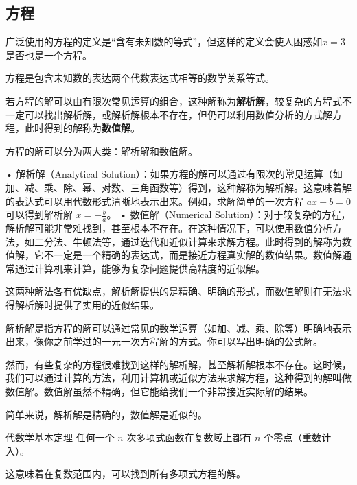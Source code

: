 
\begin{issues}
\issueDraft
\end{issues}

\subsection{方程}

广泛使用的方程的定义是“含有未知数的等式”，但这样的定义会使人困惑如$x=3$是否也是一个方程。

方程是包含未知数的表达两个代数表达式相等的数学关系等式。

若方程的解可以由有限次常见运算的组合，这种解称为\textbf{解析解}，较复杂的方程式不一定可以找出解析解，或解析解根本不存在，但仍可以利用数值分析的方式解方程，此时得到的解称为\textbf{数值解}。

方程的解可以分为两大类：解析解和数值解。

	•	解析解（Analytical Solution）：如果方程的解可以通过有限次的常见运算（如加、减、乘、除、幂、对数、三角函数等）得到，这种解称为解析解。这意味着解的表达式可以用代数形式清晰地表示出来。例如，求解简单的一次方程 $ax + b = 0$ 可以得到解析解 $x = -\frac{b}{a}$。
	•	数值解（Numerical Solution）：对于较复杂的方程，解析解可能非常难找到，甚至根本不存在。在这种情况下，可以使用数值分析方法，如二分法、牛顿法等，通过迭代和近似计算来求解方程。此时得到的解称为数值解，它不一定是一个精确的表达式，而是接近方程真实解的数值结果。数值解通常通过计算机来计算，能够为复杂问题提供高精度的近似解。

这两种解法各有优缺点，解析解提供的是精确、明确的形式，而数值解则在无法求得解析解时提供了实用的近似结果。

解析解是指方程的解可以通过常见的数学运算（如加、减、乘、除等）明确地表示出来，像你之前学过的一元一次方程解的方式。你可以写出明确的公式解。

然而，有些复杂的方程很难找到这样的解析解，甚至解析解根本不存在。这时候，我们可以通过计算的方法，利用计算机或近似方法来求解方程，这种得到的解叫做数值解。数值解虽然不精确，但它能给我们一个非常接近实际解的结果。

简单来说，解析解是精确的，数值解是近似的。

\begin{definition}{代数学基本定理}
任何一个 $n$ 次多项式函数在复数域上都有 $n$ 个零点（重数计入）。
\end{definition}
这意味着在复数范围内，可以找到所有多项式方程的解。

